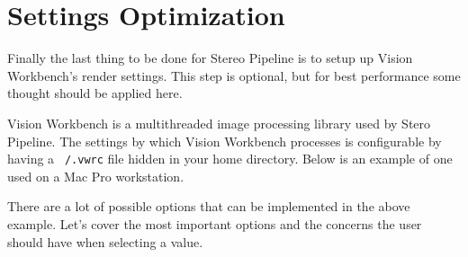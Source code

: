 \pagebreak
\section{\label{sec:Settings}Settings Optimization}

Finally the last thing to be done for Stereo Pipeline is to setup up
Vision Workbench's render settings. This step is optional, but for
best performance some thought should be applied here.

Vision Workbench is a multithreaded image processing library used by
Stero Pipeline. The settings by which Vision Workbench processes is
configurable by having a \texttt{~/.vwrc} file hidden in your home
directory. Below is an example of one used on a Mac Pro workstation.

\begin{minipage}{0.94\linewidth}
\small{}
\end{minipage}

There are a lot of possible options that can be implemented in the
above example. Let's cover the most important options and the concerns
the user should have when selecting a value.

